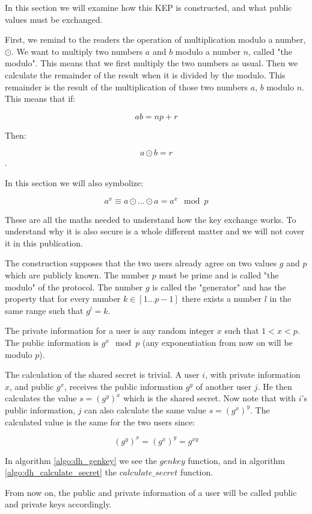 In this section we will examine how this KEP is constructed, and what public values must be exchanged.

First, we remind to the readers the operation of multiplication modulo a number, $\odot$.
We want to multiply two numbers $a$ and $b$ modulo a number $n$, called "the modulo".
This means that we first multiply the two numbers as usual.
Then we calculate the remainder of the result when it is divided by the modulo.
This remainder is the result of the multiplication of those two numbers $a$, $b$ modulo $n$.
This means that if:

\[
  ab = np + r
\]

Then:

\[
  a \odot b  = r
\]
.

In this section we will also symbolize:

\[
  a^x \equiv a \odot \dots \odot a = a^x \mod p
\]

These are all the maths needed to understand how the \dhname key exchange works.
To understand why it is also secure is a whole different matter and we will not cover it in this publication.

The \dhname construction supposes that the two users already agree on two values $g$ and $p$ which are publicly known.
The number $p$ must be prime and is called "the modulo" of the protocol.
The number $g$ is called the "generator" and has the property that for every number $k \in [1 \dots p-1]$ there exists a number $l$ in the same range such that $g^l = k$.

The private information for a user is any random integer $x$ such that $ 1 < x < p$.
The public information is $g^x \mod p$ (any exponentiation from now on will be modulo $p$).

The calculation of the shared secret is trivial.
A user $i$, with private information $x$, and public $g^x$, receives the public information $g^y$ of another user $j$.
He then calculates the value $s = (g^y)^x$ which is the shared secret.
Now note that with $i$'s public information, $j$ can also calculate the same value $s = (g^x)^y$.
The calculated value is the same for the two users since:

\[
  (g^y)^x = (g^x)^y = g^{xy}
\]

In algorithm \ref{algo:dh_genkey} we see the $genkey$ function, and in algorithm \ref{algo:dh_calculate_secret} the $calculate\_secret$ function.

From now on, the public and private information of a user will be called public and private keys accordingly.

